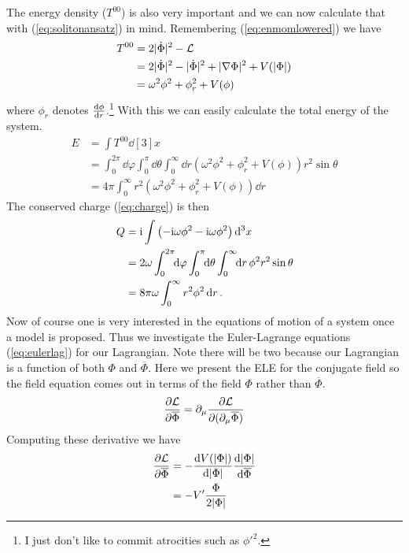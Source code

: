 The energy density (\(T^{00}\)) is also very important and we can now calculate
that with (\ref{eq:solitonansatz}) in mind. Remembering (\ref{eq:enmomlowered})
we have
\begin{align}
    T^{00} & = 2|\dot{\Phi}|^2 - \mathcal{L}                                        \\
           & = 2|\dot{\Phi}|^2 - |\dot{\Phi}|^2 + |\nabla\Phi|^2 + V(|\Phi|) \\
           & = \omega^2\phi^2 + \phi_r^2 + V(\phi)
\end{align}
where \(\phi_r\) denotes \(\dv{\phi}{r}\).\footnote{I just don't like to commit
    atrocities such as \(\phi'^2\).} With this we can easily calculate the total
energy of the system.
\begin{align}
    E & = \int T^{00}\dd[3]{x}                                                                                                                         \\
      & = \int_0^{2\pi}\!\!\dd{\varphi}\int_0^\pi\!\!\dd{\theta}\int_0^\infty\!\!\dd{r}\left(\omega^2\phi^2 + \phi_r^2 + V(\phi)\right)r^2\sin{\theta} \\
      & = 4\pi\int_0^\infty r^2\left(\omega^2\phi^2 + \phi_r^2 + V(\phi)\right)\dd{r} \label{eq:nospinenergy}
\end{align}
The conserved charge (\ref{eq:charge}) is then
\begin{align}
    Q & = \mathrm{i}\int\left(-\mathrm{i}\omega\phi^2 - \mathrm{i}\omega\phi^2\right)\dd[3]{x}                                            \\
      & = 2\omega\int_0^{2\pi}\!\!\dd{\varphi}\int_0^\pi\!\!\dd{\theta}\int_0^\infty\!\!\dd{r}\phi^2 r^2\sin{\theta} \\
      & = 8\pi\omega\int_0^\infty r^2\phi^2\dd{r} \label{eq:nospincharge}.
\end{align}
Now of course one is very interested in the equations of motion of a system once
a model is proposed. Thus we investigate the Euler-Lagrange equations
(\ref{eq:eulerlag}) for our Lagrangian. Note there will be two because our
Lagrangian is a function of both \(\Phi\) and \(\overline{\Phi}\). Here we
present the ELE for the conjugate field so the field equation comes out in terms
of the field \(\Phi\) rather than \(\overline{\Phi}\).
\begin{equation}
    \pdv{\mathcal{L}}{\overline{\Phi}} = \partial_\mu\pdv{\mathcal{L}}{(\partial_\mu\overline{\Phi})}
\end{equation}
Computing these derivative we have
\begin{align}
    \pdv{\mathcal{L}}{\overline{\Phi}} & = -\dv{V(|\Phi|)}{|\Phi|}\dv{|\Phi|}{\overline{\Phi}} \\
                                & = -V'\frac{\Phi}{2|\Phi|}
\end{align}
